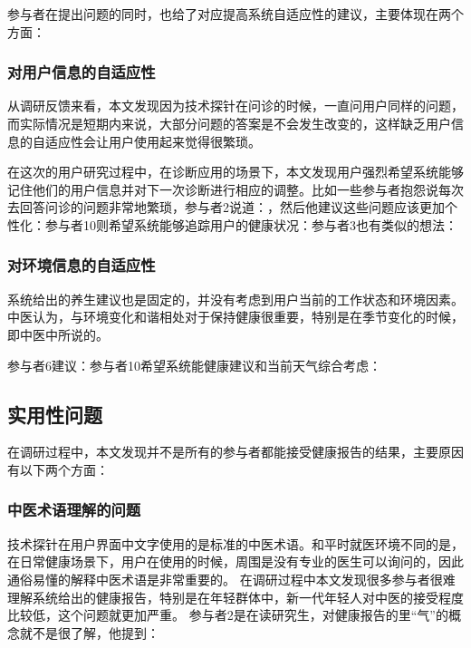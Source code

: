 参与者在提出问题的同时，也给了对应提高系统自适应性的建议，主要体现在两个方面：

\subsubsection{对用户信息的自适应性}

从调研反馈来看，本文发现因为技术探针在问诊的时候，一直问用户同样的问题，而实际情况是短期内来说，大部分问题的答案是不会发生改变的，这样缺乏用户信息的自适应性会让用户使用起来觉得很繁琐。

在这次的用户研究过程中，在诊断应用的场景下，本文发现用户强烈希望系统能够记住他们的用户信息并对下一次诊断进行相应的调整。比如一些参与者抱怨说每次去回答问诊的问题非常地繁琐，参与者2说道：，然后他建议这些问题应该更加个性化：参与者10则希望系统能够追踪用户的健康状况：参与者3也有类似的想法：

\subsubsection{对环境信息的自适应性}

系统给出的养生建议也是固定的，并没有考虑到用户当前的工作状态和环境因素。中医认为，与环境变化和谐相处对于保持健康很重要，特别是在季节变化的时候，即中医中所说的。

参与者6建议：参与者10希望系统能健康建议和当前天气综合考虑：


\subsection{实用性问题}
在调研过程中，本文发现并不是所有的参与者都能接受健康报告的结果，主要原因有以下两个方面：

\subsubsection{中医术语理解的问题}

技术探针在用户界面中文字使用的是标准的中医术语。和平时就医环境不同的是，在日常健康场景下，用户在使用的时候，周围是没有专业的医生可以询问的，因此通俗易懂的解释中医术语是非常重要的。
在调研过程中本文发现很多参与者很难理解系统给出的健康报告，特别是在年轻群体中，新一代年轻人对中医的接受程度比较低，这个问题就更加严重。
参与者2是在读研究生，对健康报告的里“气”的概念就不是很了解，他提到：

